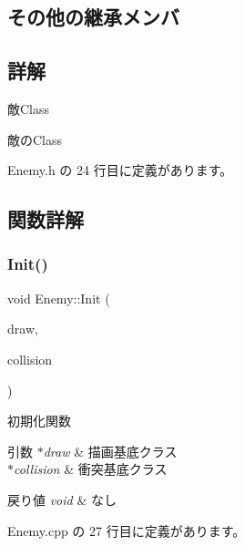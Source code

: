 \subsection*{その他の継承メンバ}


\subsection{詳解}
敵\+Class 

敵の\+Class 

 Enemy.\+h の 24 行目に定義があります。



\subsection{関数詳解}
\mbox{\label{class_enemy_a3150c4d6c741494eda76bd59e9ed751b}} 
\subsubsection{\texorpdfstring{Init()}{Init()}}
{\footnotesize\ttfamily void Enemy\+::\+Init (\begin{DoxyParamCaption}\item[{\mbox{\hyperlink{class_draw_base}{Draw\+Base}} $\ast$}]{draw,  }\item[{\mbox{\hyperlink{class_collision_base}{Collision\+Base}} $\ast$}]{collision }\end{DoxyParamCaption})}



初期化関数 


\begin{DoxyParams}{引数}
{\em $\ast$draw} & 描画基底クラス \\
\hline
{\em $\ast$collision} & 衝突基底クラス \\
\hline
\end{DoxyParams}

\begin{DoxyRetVals}{戻り値}
{\em void} & なし \\
\hline
\end{DoxyRetVals}


 Enemy.\+cpp の 27 行目に定義があります。

\mbox{\label{class_enemy_a614ad271f07ecf63cb3e665155b7e258}} 
